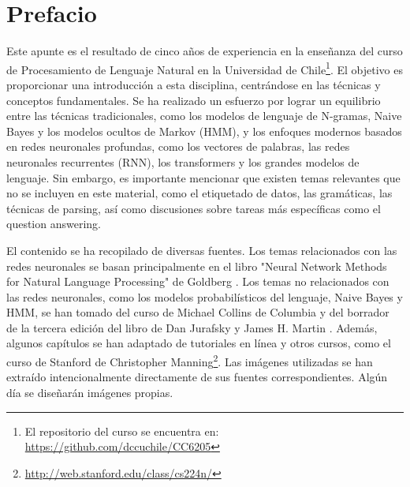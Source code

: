\documentclass[11pt,fleqn]{book} %
\begin{document}

\pagestyle{fancy} %


\chapter*{Prefacio}
Este apunte es el resultado de cinco años de experiencia en la enseñanza del curso de Procesamiento de Lenguaje Natural en la Universidad de Chile\footnote{El repositorio del curso se encuentra en: \url{https://github.com/dccuchile/CC6205}}. El objetivo es proporcionar una introducción a esta disciplina, centrándose en las técnicas y conceptos fundamentales. Se ha realizado un esfuerzo por lograr un equilibrio entre las técnicas tradicionales, como los modelos de lenguaje de N-gramas, Naive Bayes y los modelos ocultos de Markov (HMM), y los enfoques modernos basados en redes neuronales profundas, como los vectores de palabras, las redes neuronales recurrentes (RNN), los transformers y los grandes modelos de lenguaje. Sin embargo, es importante mencionar que existen temas relevantes que no se incluyen en este material, como el etiquetado de datos, las gramáticas, las técnicas de parsing, así como discusiones sobre tareas más específicas como el question answering.

El contenido se ha recopilado de diversas fuentes. Los temas relacionados con las redes neuronales se basan principalmente en el libro "Neural Network Methods for Natural Language Processing" de Goldberg \cite{goldberg2017neural}. Los temas no relacionados con las redes neuronales, como los modelos probabilísticos del lenguaje, Naive Bayes y HMM, se han tomado del curso de Michael Collins de Columbia \cite{collins2013language} y del borrador de la tercera edición del libro de Dan Jurafsky y James H. Martin \cite{JurafskyBook}. Además, algunos capítulos se han adaptado de tutoriales en línea y otros cursos, como el curso de Stanford de Christopher Manning\footnote{\url{http://web.stanford.edu/class/cs224n/}}. Las imágenes utilizadas se han extraído intencionalmente directamente de sus fuentes correspondientes. Algún día se diseñarán imágenes propias.



\end{document}

